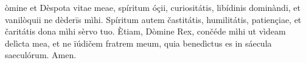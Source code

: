 òmine et Dèspota vitae meae, spíritum óçii, curiositátis, libídinis dominàndi, et vanilòquii ne dèderīs mìhi. Spíritum autem častitátis, humilitátis, patiençiae, et čaritátis dona mìhi sèrvo tuo. Ètiam, Dòmine Rex, cončéde mìhi ut vìdeam delìcta mea, et ne ïúdičem fratrem meum, quia benedìctus es in sáecula saeculórum. Amen.
